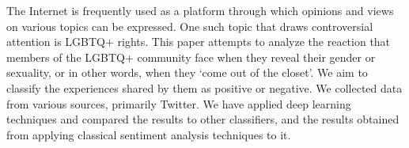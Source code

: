 The Internet is frequently used as a platform through which opinions and views on various topics can be expressed. One such topic that draws controversial attention is LGBTQ+ rights. This paper attempts to analyze the reaction that members of the LGBTQ+ community face when they reveal their gender or sexuality, or in other words, when they ‘come out of the closet'. We aim to classify the experiences shared by them as positive or negative. We collected data from various sources, primarily Twitter. We have applied deep learning techniques and compared the results to other classifiers, and the results obtained from applying classical sentiment analysis techniques to it.
